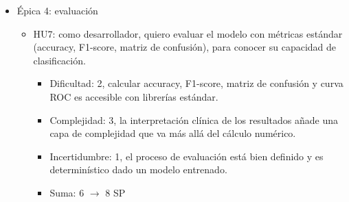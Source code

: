 \documentclass[
11pt, %
]{charter}
\begin{document}
\begin{itemize}
\begin{itemize}
\begin{itemize}
        \item Incertidumbre: 6, el comportamiento del modelo no es predecible hasta experimentar. Es probable que los resultados preliminares obliguen a revisar
        parámetros/decisiones previas.
        \item Suma: 14 $\rightarrow$ 21 SP
      \end{itemize}
      \item HU6: como desarrollador, quiero comparar el rendimiento del modelo sobre sonidos cardíacos y pulmonares por separado y de forma integrada,
      para determinar el mejor enfoque de clasificación.
      \begin{itemize}
        \item Dificultad: 3, comparar modelos entrenados de forma separada versus integrada requiere un diseño experimental riguroso para que los resultados 
        sean comparables y concluyentes.
        \item Complejidad: 5, implica entrenar y evaluar múltiples variantes del modelo, analizar errores por tipo de patología y sintetizar conclusiones 
        sobre el enfoque más efectivo.
        \item Incertidumbre: 6, los resultados comparativos son completamente desconocidos hasta ejecutar los experimentos, y pueden surgir hallazgos
        inesperados que requieran iteraciones adicionales.
        \item Suma: 14 $\rightarrow$ 21 SP
      \end{itemize}
    \end{itemize}
  \item Épica 4: evaluación
    \begin{itemize}
      \item HU7: como desarrollador, quiero evaluar el modelo con métricas estándar (accuracy, F1-score, matriz de confusión), para conocer su capacidad 
      de clasificación.
      \begin{itemize}
        \item Dificultad: 2, calcular accuracy, F1-score, matriz de confusión y curva ROC es accesible con librerías estándar.
        \item Complejidad: 3, la interpretación clínica de los resultados añade una capa de complejidad que va más allá del cálculo numérico.
        \item Incertidumbre: 1, el proceso de evaluación está bien definido y es determinístico dado un modelo entrenado.
        \item Suma: 6 $\rightarrow$ 8 SP

\end{itemize}
\end{itemize}
\end{itemize}
\end{document}
